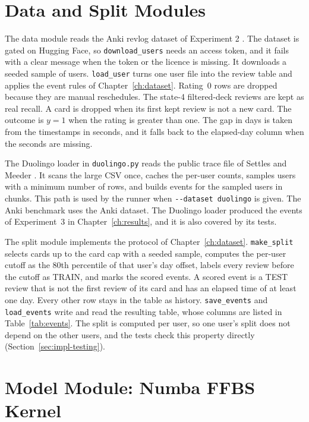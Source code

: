 \section{Data and Split Modules}
\label{sec:impl-data}

The data module reads the Anki revlog dataset of Experiment 2 \cite{ankirevlogs10k}. The dataset is
gated on Hugging Face, so \texttt{download\_users} needs an access token, and it fails with a clear
message when the token or the licence is missing. It downloads a seeded sample of users. \texttt{load\_user}
turns one user file into the review table and applies the event rules of Chapter~\ref{ch:dataset}.
Rating~0 rows are dropped because they are manual reschedules. The state-4 filtered-deck reviews are
kept as real recall. A card is dropped when its first kept review is not a new card. The outcome is
$y = 1$ when the rating is greater than one. The gap in days is taken from the timestamps in seconds,
and it falls back to the elapsed-day column when the seconds are missing.

The Duolingo loader in \texttt{duolingo.py} reads the public trace file of Settles and Meeder
\cite{settles2016trainable}. It scans the large CSV once, caches the per-user counts, samples users
with a minimum number of rows, and builds events for the sampled users in chunks. This path is used
by the runner when \texttt{-{}-dataset duolingo} is given. The Anki benchmark uses the Anki dataset. The Duolingo loader produced the events of Experiment~3 in Chapter~\ref{ch:results}, and it is also covered by its tests.

The split module implements the protocol of Chapter~\ref{ch:dataset}. \texttt{make\_split} selects
cards up to the card cap with a seeded sample, computes the per-user cutoff as the 80th percentile of
that user's day offset, labels every review before the cutoff as TRAIN, and marks the scored events.
A scored event is a TEST review that is not the first review of its card and has an elapsed time of
at least one day. Every other row stays in the table as history. \texttt{save\_events} and
\texttt{load\_events} write and read the resulting table, whose columns are listed in
Table~\ref{tab:events}. The split is computed per user, so one user's split does not depend on the
other users, and the tests check this property directly (Section~\ref{sec:impl-testing}).

\section{Model Module: Numba FFBS Kernel}
\label{sec:impl-model}

